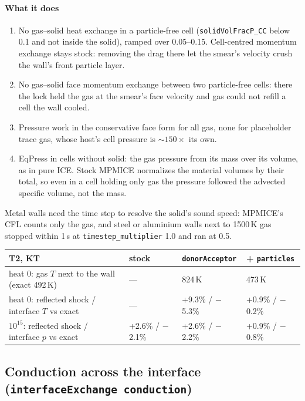 \documentclass[11pt]{article}
\newcommand{\code}[1]{\texttt{\small #1}}
\begin{document}
\paragraph{What it does}
\begin{enumerate}[leftmargin=*]
  \item No gas--solid heat exchange in a particle-free cell (\code{solidVolFracP\_CC} below
        0.1 and not inside the solid), ramped over 0.05--0.15. Cell-centred momentum exchange
        stays stock: removing the drag there let the smear's velocity crush the wall's front
        particle layer.
  \item No gas--solid face momentum exchange between two particle-free cells: there the lock
        held the gas at the smear's face velocity and gas could not refill a cell the wall
        cooled.
  \item Pressure work in the conservative face form for all gas, none for placeholder trace
        gas, whose host's cell pressure is $\sim150\times$ its own.
  \item EqPress in cells without solid: the gas pressure from its mass over its volume, as in
        pure ICE. Stock MPMICE normalizes the material volumes by their total, so even in a
        cell holding only gas the pressure followed the advected specific volume, not the mass.
\end{enumerate}
Metal walls need the time step to resolve the solid's sound speed: MPMICE's CFL counts only
the gas, and steel or aluminium walls next to 1500\,K gas stopped within 1\,\textmu s at
\code{timestep\_multiplier} 1.0 and ran at 0.5.

\begin{center}\small
\begin{tabular}{@{}llll@{}}
\toprule
T2, KT & stock & \code{donorAcceptor} & + \code{particles} \\
\midrule
heat 0: gas $T$ next to the wall (exact 492\,K) & --- & 824\,K & 473\,K \\
heat 0: reflected shock / interface $T$ vs exact & --- & +9.3\% / $-$5.3\% & +0.9\% / $-$0.2\% \\
$10^{15}$: reflected shock / interface $p$ vs exact & +2.6\% / $-$2.1\% & +2.6\% / $-$2.2\% & +0.9\% / $-$0.8\% \\
\bottomrule
\end{tabular}
\end{center}

\subsection{Conduction across the interface (\code{interfaceExchange conduction})}
\end{document}
